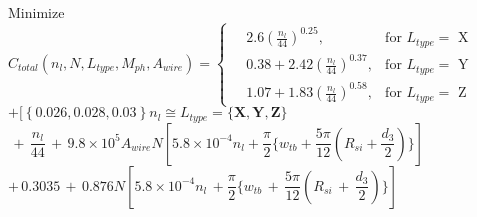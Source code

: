 \begin{singlespacing}

\begin{flushleft}



Minimize   \\
$ C_{total} (n_{l}, N, L_{type}, M_{ph}, A_{wire}) = 
\begin{cases}
\quad 2.6(\frac{n_{l}}{44})^{0.25}, & \text{for $L_{type} =$ X} \\
\quad 0.38 + 2.42(\frac{n_{l}}{44})^{0.37}, & \text{for $L_{type} =$ Y} \\
\quad 1.07 + 1.83(\frac{n_{l}}{44})^{0.58}, & \text{for $L_{type} =$ Z} 
\end{cases} $ \\

$
+  [ \left\{0.026, 0.028, 0.03\right\}n_{l} \cong L_{type} = \{ \textbf{X}, \textbf{Y}, \textbf{Z} \} $\\
$
\, + \, \dfrac{n_{l}}{44} \, + \,   9.8 \times 10^{5} A_{wire} N [ 5.8  \times  10^{-4} n_{l}
   +  \dfrac{\pi}{2} \{ w_{tb} + \dfrac{5\pi}{12}(R_{si} + \dfrac{d_{3}}{2}) \}]
$ \\

$
+ \, 0.3035 \, + \, 0.876 N [ 5.8 \times 10^{-4} n_{l} \, + 
 \dfrac{\pi}{2} \{ w_{tb} \, + \, \dfrac{5 \pi}{12}(R_{si} \, + \, \dfrac{d_{3}}{2})\}]
$\\


\end{flushleft}
\end{singlespacing}
